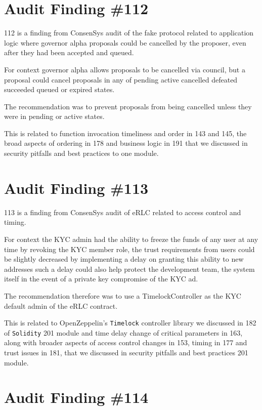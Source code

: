 \section{Audit Finding \#112}

112 is a finding from ConsenSys audit of the fake protocol related to application logic where governor alpha proposals could be cancelled by the proposer, even after they had been accepted and queued. 

For context governor alpha allows proposals to be cancelled via council, but a proposal could cancel proposals in any of pending active cancelled defeated succeeded queued or expired states.

The recommendation was to prevent proposals from being cancelled unless they were in pending or active states.

This is related to function invocation timeliness and order in 143 and 145, the broad aspects of ordering in 178 and business logic in 191 that we discussed in security pitfalls and best practices to one module.

\section{Audit Finding \#113}

113 is a finding from ConsenSys audit of eRLC related to access control and timing. 

For context the KYC admin had the ability to freeze the funds of any user at any time by revoking the KYC member role, the trust requirements from users could be slightly decreased by implementing a delay on granting this ability to new addresses such a delay could also help protect the development team, the system itself in the event of a private key compromise of the KYC ad.

The recommendation therefore was to use a TimelockController as the KYC default admin of the eRLC contract.

This is related to OpenZeppelin's \verb|Timelock| controller library we discussed in 182 of \verb|Solidity| 201 module and time delay change of critical parameters in 163, along with broader aspects of access control changes in 153, timing in 177 and trust issues in 181, that we discussed in security pitfalls and best practices 201 module.

\section{Audit Finding \#114}

